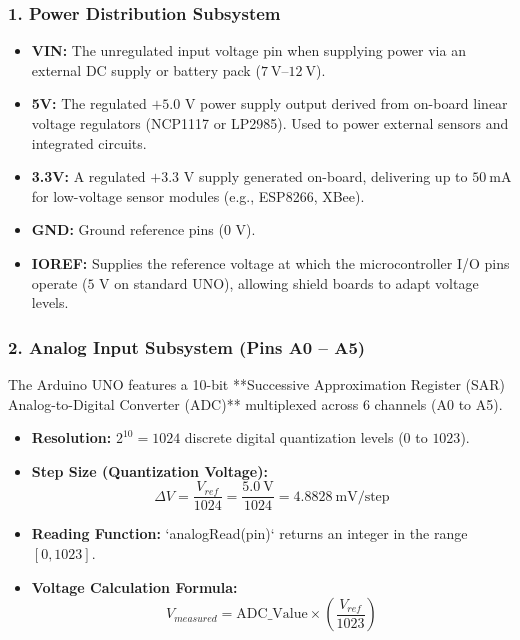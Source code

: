 \subsubsection{1. Power Distribution Subsystem}
\begin{itemize}
    \item \textbf{VIN:} The unregulated input voltage pin when supplying power via an external DC supply or battery pack ($\SI{7}{\volt}\text{--}\SI{12}{\volt}$).
    \item \textbf{5V:} The regulated $+5.0\text{ V}$ power supply output derived from on-board linear voltage regulators (NCP1117 or LP2985). Used to power external sensors and integrated circuits.
    \item \textbf{3.3V:} A regulated $+3.3\text{ V}$ supply generated on-board, delivering up to $\SI{50}{\milli\ampere}$ for low-voltage sensor modules (e.g., ESP8266, XBee).
    \item \textbf{GND:} Ground reference pins ($0\text{ V}$).
    \item \textbf{IOREF:} Supplies the reference voltage at which the microcontroller I/O pins operate ($5\text{ V}$ on standard UNO), allowing shield boards to adapt voltage levels.
\end{itemize}

\subsubsection{2. Analog Input Subsystem (Pins A0 – A5)}
The Arduino UNO features a 10-bit **Successive Approximation Register (SAR) Analog-to-Digital Converter (ADC)** multiplexed across 6 channels (A0 to A5).
\begin{itemize}
    \item \textbf{Resolution:} $2^{10} = 1024$ discrete digital quantization levels ($0$ to $1023$).
    \item \textbf{Step Size (Quantization Voltage):}
    \begin{equation}
        \Delta V = \frac{V_{ref}}{1024} = \frac{\SI{5.0}{\volt}}{1024} = \SI{4.8828}{\milli\volt\per\text{step}}
    \end{equation}
    \item \textbf{Reading Function:} `analogRead(pin)` returns an integer in the range $[0, 1023]$.
    \item \textbf{Voltage Calculation Formula:}
    \begin{equation}
        V_{measured} = \text{ADC\_Value} \times \left( \frac{V_{ref}}{1023} \right)
    \end{equation}
\end{itemize}

